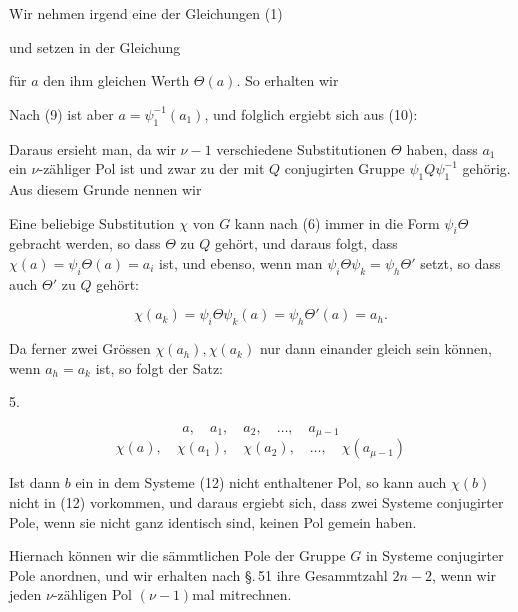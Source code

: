Wir nehmen irgend eine der Gleichungen (1)


und setzen in der Gleichung


für $a$ den ihm gleichen Werth $\Theta(a)$. So erhalten wir


Nach (9) ist aber $a = \psi_1^{-1}(a_1)$, und folglich ergiebt sich aus (10):


Daraus ersieht man, da wir $\nu - 1$ verschiedene Substitutionen $\Theta$ haben, dass $a_1$ ein $\nu$-zähliger Pol ist und zwar zu der mit $Q$ conjugirten Gruppe $\psi_1 Q \psi_1^{-1}$ gehörig. Aus diesem Grunde nennen wir



Eine beliebige Substitution $\chi$ von $G$ kann nach (6) immer in die Form $\psi_i \Theta$ gebracht werden, so dass $\Theta$ zu $Q$ gehört, und daraus folgt, dass $\chi(a) = \psi_i \Theta(a) = a_i$ ist, und ebenso, wenn man $\psi_i \Theta \psi_k = \psi_h \Theta'$ setzt, so dass auch $\Theta'$ zu $Q$ gehört:

\[ \chi(a_k) = \psi_i \Theta \psi_k(a) = \psi_h \Theta'(a) = a_h. \]

Da ferner zwei Grössen $\chi(a_h), \chi(a_k)$ nur dann einander gleich sein können, wenn $a_h = a_k$ ist, so folgt der Satz:

5. 

\[ a, \quad a_1, \quad a_2, \quad \ldots, \quad a_{\mu-1} \]
\[ \chi(a), \quad \chi(a_1), \quad \chi(a_2), \quad \ldots, \quad \chi(a_{\mu-1}) \]


Ist dann $b$ ein in dem Systeme (12) nicht enthaltener Pol, so kann auch $\chi(b)$ nicht in (12) vorkommen, und daraus ergiebt sich, dass zwei Systeme conjugirter Pole, wenn sie nicht ganz identisch sind, keinen Pol gemein haben.

Hiernach können wir die sämmtlichen Pole der Gruppe $G$ in Systeme conjugirter Pole anordnen, und wir erhalten nach \S.\,51 ihre Gesammtzahl $2n - 2$, wenn wir jeden $\nu$-zähligen Pol $(\nu - 1)$mal mitrechnen.
